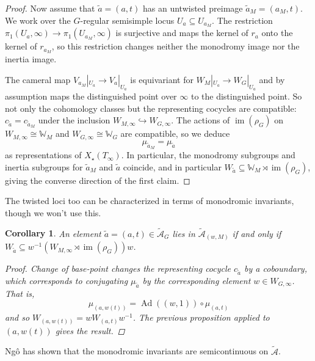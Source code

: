 \documentclass[openany]{amsbook}
\newtheorem{corollary}[theorem]{Corollary}
\theoremstyle{definition}
\theoremstyle{remark}
\numberwithin{equation}{section}
\newcommand{\W}{\mathbb{W}}
\newcommand{\cA}{\mathcal{A}}
\newcommand{\im}{\operatorname{im}}
\renewcommand{\-}{\operatorname{-}}
\newcommand{\on}[1]{\operatorname{#1}}
\newcommand{\wtilde}[1]{\widetilde{#1}}
\newcommand{\ctA}{\widetilde{\cA}}
\newcommand{\ctAt}[2]{\ctA_{(#1,#2)}}
\newcommand{\Ad}{\on{Ad}}
\begin{document}
\begin{proof}
    Now assume that $\wtilde{a} = (a,t)$ has an untwisted preimage $\wtilde{a}_M = (a_M, t)$. We work over the $G$-regular semisimple locus $U_a \subseteq U_{a_M}$. The restriction $\pi_1(U_a, \infty) \to \pi_1(U_{a_M}, \infty)$ is surjective and maps the kernel of $r_a$ onto the kernel of $r_{a_M}$, so this restriction changes neither the monodromy image nor the inertia image.
    
    The cameral map $V_{a_M}|_{U_a} \to V_a|_{U_a}$ is equivariant for $W_M|_{U_a} \to W_G|_{U_a}$ and by assumption maps the distinguished point over $\infty$ to the distinguished point. So not only the cohomology classes but the representing cocycles are compatible: $c_{\wtilde{a}} = c_{\wtilde{a}_M}$ under the inclusion $W_{M,\infty} \hookrightarrow W_{G, \infty}$. The actions of $\im(\rho_G)$ on $W_{M,\infty} \cong \W_M$ and $W_{G,\infty} \cong \W_G$ are compatible, so we deduce
    $$
        \mu_{\wtilde{a}_M} = \mu_{\wtilde{a}}
    $$
    as representations of $X_\star(T_\infty)$. In particular, the monodromy subgroups and inertia subgroups for $\wtilde{a}_M$ and $\wtilde{a}$ coincide, and in particular $W_{\wtilde{a}} \subseteq \W_M \rtimes \im(\rho_G)$, giving the converse direction of the first claim.
    
                        
                    \end{proof}

The twisted loci too can be characterized in terms of monodromic invariants, though we won't use this.

\begin{corollary}\label{prop.ngo.comparison.tw}
    An element $\wtilde{a} = (a, t) \in \ctA_G$ lies in $\ctAt{w}{M}$ if and only if $W_{\wtilde{a}} \subseteq w^{-1}(W_{M, \infty} \rtimes \im(\rho_G))w$.
\begin{proof}
    Change of base-point changes the representing cocycle $c_{\wtilde{a}}$ by a coboundary, which corresponds to conjugating $\mu_{\wtilde{a}}$ by the corresponding element $w \in W_{G, \infty}$. That is,
    $$
        \mu_{(a, w(t))} = \Ad((w,1)) \circ \mu_{(a,t)}
    $$
    and so $W_{(a,w(t))} = w W_{(a,t)} w^{-1}$. The previous proposition applied to $(a,w(t))$ gives the result.
    
            
                \end{proof}
\end{corollary}


Ng\^{o} has shown that the monodromic invariants are semicontinuous on $\ctA$.
\end{document}

